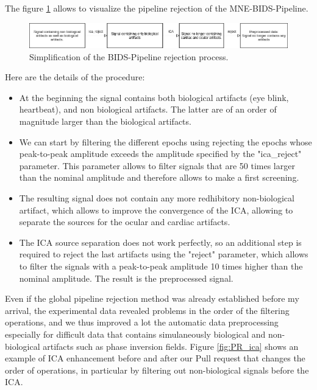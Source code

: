 The figure \ref{rejection_pipeline} allows to visualize the pipeline rejection of the MNE-BIDS-Pipeline.

\begin{figure}[ht]
    \centering
    \includegraphics[width=15cm]{images_report/preprocessing/rejection_pipeline.png}
    \caption[Simplification of the BIDS-Pipeline rejection process.]%
    {Simplification of the BIDS-Pipeline rejection process.}
    \label{rejection_pipeline}
\end{figure}

Here are the details of the procedure:
\begin{itemize}
    \item At the beginning the signal contains both biological artifacts (eye blink, heartbeat), and non biological artifacts. The latter are of an order of magnitude larger than the biological artifacts.
    \item We can start by filtering the different epochs using rejecting the epochs whose peak-to-peak amplitude exceeds the amplitude specified by the "ica\_reject" parameter. This parameter allows to filter signals that are 50 times larger than the nominal amplitude and therefore allows to make a first screening.
    \item The resulting signal does not contain any more redhibitory non-biological artifact, which allows to improve the convergence of the ICA, allowing to separate the sources for the ocular and cardiac artifacts.
    \item The ICA source separation does not work perfectly, so an additional step is required to reject the last artifacts using the "reject" parameter, which allows to filter the signals with a peak-to-peak amplitude 10 times higher than the nominal amplitude. The result is the preprocessed signal.
\end{itemize}

Even if the global pipeline rejection method was already established before my arrival, the experimental data revealed problems in the order of the filtering operations, and we thus improved a lot the automatic data preprocessing especially for difficult data that contains simulaneously biological and non-biological artifacts such as phase inversion fields. Figure \ref{fig:PR_ica} shows an example of ICA enhancement before and after our Pull request that changes the order of operations, in particular by filtering out non-biological signals before the ICA.


